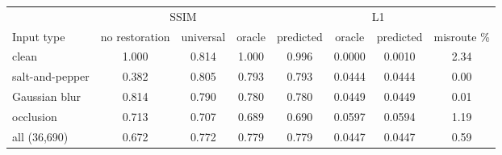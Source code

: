 \begin{tabular}{lccccccc}
\toprule
 & \multicolumn{3}{c}{SSIM} & & \multicolumn{2}{c}{L1} & \\
\cmidrule(lr){2-5}\cmidrule(lr){6-7}
Input type & no restoration & universal & oracle & predicted & oracle & predicted & misroute \% \\
\midrule
clean & 1.000 & 0.814 & 1.000 & 0.996 & 0.0000 & 0.0010 & 2.34 \\
salt-and-pepper & 0.382 & 0.805 & 0.793 & 0.793 & 0.0444 & 0.0444 & 0.00 \\
Gaussian blur & 0.814 & 0.790 & 0.780 & 0.780 & 0.0449 & 0.0449 & 0.01 \\
occlusion & 0.713 & 0.707 & 0.689 & 0.690 & 0.0597 & 0.0594 & 1.19 \\
\midrule
all (36,690) & 0.672 & 0.772 & 0.779 & 0.779 & 0.0447 & 0.0447 & 0.59 \\
\bottomrule
\end{tabular}

